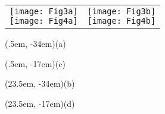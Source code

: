 \documentclass[varwidth=36em]{standalone}
\begin{document}
\begin{tabular}[c]{p{23em}p{50em}}
\shortstack[c]{
 \texttt{[image: Fig3a]} \\
\texttt{[image: Fig4a]}}
& 
\shortstack[c]{
\texttt{[image: Fig3b]}\\[1cm]
\texttt{[image: Fig4b]}\\[0.3cm]}
\end{tabular}
\begin{textblock*}{5em}(.5em, -34em)\sf (a)\end{textblock*}
\begin{textblock*}{5em}(.5em, -17em)\sf (c)\end{textblock*}
\begin{textblock*}{5em}(23.5em, -34em)\sf (b)\end{textblock*}
\begin{textblock*}{5em}(23.5em, -17em)\sf (d)\end{textblock*}
\end{document}
